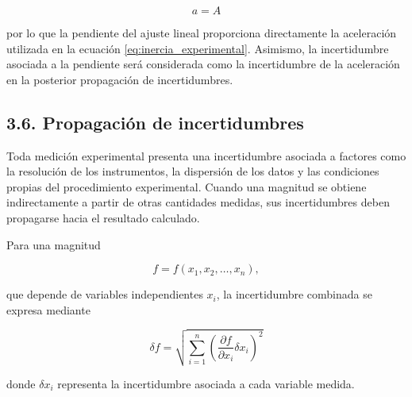\documentclass[11pt,a4paper]{article}
\begin{document}
\begin{equation}
a=A
\label{eq:aceleracion_pendiente}
\end{equation}

por lo que la pendiente del ajuste lineal proporciona directamente la
aceleración utilizada en la ecuación \eqref{eq:inercia_experimental}.
Asimismo, la incertidumbre asociada a la pendiente será considerada como
la incertidumbre de la aceleración en la posterior propagación de
incertidumbres.


\subsection*{3.6. Propagación de incertidumbres}

Toda medición experimental presenta una incertidumbre asociada a factores
como la resolución de los instrumentos, la dispersión de los datos y las
condiciones propias del procedimiento experimental. Cuando una magnitud se
obtiene indirectamente a partir de otras cantidades medidas, sus
incertidumbres deben propagarse hacia el resultado calculado.

Para una magnitud

\[
f=f(x_1,x_2,\ldots,x_n),
\]

que depende de variables independientes \(x_i\), la incertidumbre combinada
se expresa mediante

\begin{equation}
\delta f=
\sqrt{
\sum_{i=1}^{n}
\left(
\frac{\partial f}{\partial x_i}\delta x_i
\right)^2
}
\label{eq:propagacion_general}
\end{equation}

donde \(\delta x_i\) representa la incertidumbre asociada a cada variable
medida.


\end{document}
